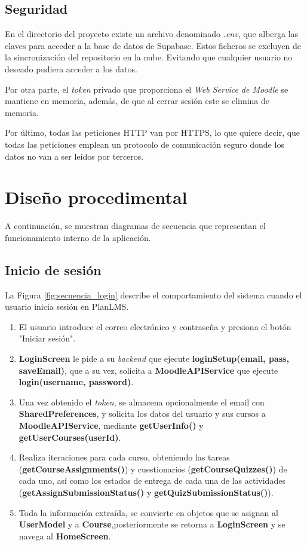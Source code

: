 \subsection{Seguridad}
En el directorio del proyecto existe un archivo denominado \textit{.env}, que alberga las claves para acceder a la base de datos de Supabase. Estos ficheros se excluyen de la sincronización del repositorio en la nube. Evitando que cualquier usuario no deseado pudiera acceder a los datos.

Por otra parte, el \textit{token} privado que proporciona el \textit{Web Service de Moodle} se mantiene en memoria, además, de que al cerrar sesión este se elimina de memoria.

Por último, todas las peticiones HTTP van por HTTPS, lo que quiere decir, que todas las peticiones emplean un protocolo de comunicación seguro donde los datos no van a ser leídos por terceros.

\section{Diseño procedimental}
A continuación, se muestran diagramas de secuencia que representan el funcionamiento interno de la aplicación.

\subsection{Inicio de sesión}
La Figura \ref{fig:secuencia_login} describe el comportamiento del sistema cuando el usuario inicia sesión en PlanLMS.

\begin{enumerate}
    \item El usuario introduce el correo electrónico y contraseña y presiona el botón "Iniciar sesión".
    \item \textbf{LoginScreen} le pide a su \textit{backend} que ejecute \textbf{loginSetup(email, pass, saveEmail)}, que a su vez, solicita a \textbf{MoodleAPIService} que ejecute \textbf{login(username, password)}.
    \item Una vez obtenido el \textit{token}, se almacena opcionalmente el email con \textbf{SharedPreferences}, y solicita los datos del usuario y sus cursos a \textbf{MoodleAPIService}, mediante \textbf{getUserInfo()} y \textbf{getUserCourses(userId)}.
    \item Realiza iteraciones para cada curso, obteniendo las tareas (\textbf{getCourseAssignments()}) y cuestionarios (\textbf{getCourseQuizzes()}) de cada uno, así como los estados de entrega de cada una de las actividades (\textbf{getAssignSubmissionStatus()} y \textbf{getQuizSubmissionStatus()}).
    \item Toda la información extraída, se convierte en objetos que se asignan al \textbf{UserModel} y a \textbf{Course},posteriormente se retorna a \textbf{LoginScreen} y se navega al \textbf{HomeScreen}.
\end{enumerate}

